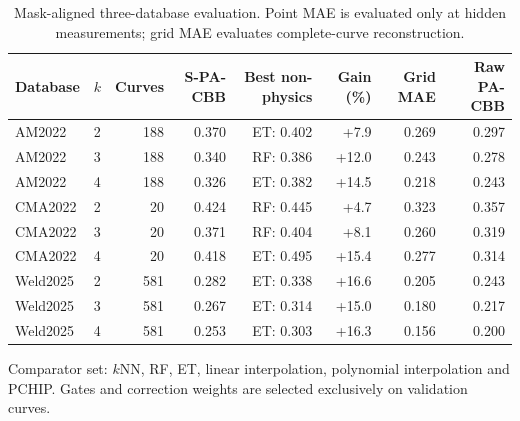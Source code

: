 \begin{table}[t]
\centering
\small
\setlength{\tabcolsep}{4.2pt}
\caption{Mask-aligned three-database evaluation. Point MAE is evaluated only at hidden measurements; grid MAE evaluates complete-curve reconstruction.}
\label{tab:three_database_latest}
\begin{tabular}{llrrrrrr}
\toprule
Database & $k$ & Curves & S-PA-CBB & Best non-physics & Gain (\%) & Grid MAE & Raw PA-CBB \\
\midrule
AM2022 & 2 & 188 & 0.370 & ET: 0.402 & +7.9 & 0.269 & 0.297 \\
AM2022 & 3 & 188 & 0.340 & RF: 0.386 & +12.0 & 0.243 & 0.278 \\
AM2022 & 4 & 188 & 0.326 & ET: 0.382 & +14.5 & 0.218 & 0.243 \\
CMA2022 & 2 & 20 & 0.424 & RF: 0.445 & +4.7 & 0.323 & 0.357 \\
CMA2022 & 3 & 20 & 0.371 & RF: 0.404 & +8.1 & 0.260 & 0.319 \\
CMA2022 & 4 & 20 & 0.418 & ET: 0.495 & +15.4 & 0.277 & 0.314 \\
Weld2025 & 2 & 581 & 0.282 & ET: 0.338 & +16.6 & 0.205 & 0.243 \\
Weld2025 & 3 & 581 & 0.267 & ET: 0.314 & +15.0 & 0.180 & 0.217 \\
Weld2025 & 4 & 581 & 0.253 & ET: 0.303 & +16.3 & 0.156 & 0.200 \\
\bottomrule
\end{tabular}
\begin{minipage}{0.98\textwidth}\footnotesize Comparator set: $k$NN, RF, ET, linear interpolation, polynomial interpolation and PCHIP. Gates and correction weights are selected exclusively on validation curves.\end{minipage}
\end{table}
